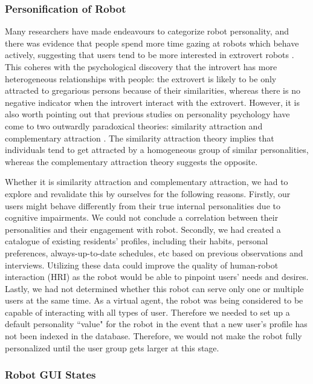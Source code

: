 \documentclass[letterpaper, 10 pt, conference]{ieeeconf}  %
\begin{document}
\subsubsection{Personification of Robot}

Many researchers have made endeavours to categorize robot personality, and there was evidence that people spend more time gazing at robots which behave actively, suggesting that users tend to be more interested in extrovert robots \cite{Mubin2014}. This coheres with the psychological discovery \cite{Hendrick1971} that the introvert has more heterogeneous relationships with people: the extrovert is likely to be only attracted to gregarious persons because of their similarities, whereas there is no negative indicator when the introvert interact with the extrovert. However, it is also worth pointing out that previous studies on personality psychology have come to two outwardly paradoxical theories: similarity attraction and complementary attraction \cite{Brandon2012}. The similarity attraction theory implies that individuals tend to get attracted by a homogeneous group of similar personalities, whereas the complementary attraction theory suggests the opposite.

Whether it is similarity attraction and complementary attraction, we had to explore and revalidate this by ourselves for the following reasons. Firstly, our users might behave differently from their true internal personalities due to cognitive impairments. We could not conclude a correlation between their personalities and their engagement with robot. Secondly, we had created a catalogue of existing residents' profiles, including their habits, personal preferences, always-up-to-date schedules, etc based on previous observations and interviews. Utilizing these data could improve the quality of human-robot interaction (HRI) as the robot would be able to pinpoint users' needs and desires. Lastly, we had not determined whether this robot can serve only one or multiple users at the same time. As a virtual agent, the robot was being considered to be capable of interacting with all types of user. Therefore we needed to set up a default personality ``value" for the robot in the event that a new user's profile has not been indexed in the database. Therefore, we would not make the robot fully personalized until the user group gets larger at this stage.


\subsubsection{Robot GUI States}
\end{document}
